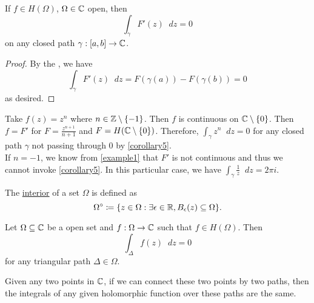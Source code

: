 \documentclass[11pt]{article}
\newcommand*\dif{\mathop{}\!d}
\begin{document}
\begin{corollary}
	If $f \in H(\Omega)$, $\Omega \in \mathbb{C}$ open, then
	\begin{equation*}
		\int_\gamma F'(z) \dif z = 0
	\end{equation*}
	on any closed path $\gamma: [a,b] \to \mathbb{C}$.
	\label{corollary5}
\end{corollary}
\begin{proof}
	By the , we have
	\begin{equation*}
		\int_\gamma F'(z) \dif z = F(\gamma(a))-F(\gamma(b)) = 0
	\end{equation*}
	as desired.
\end{proof}
\begin{example}
	Take $f(z) = z^n$ where $n \in \mathbb{Z} \setminus \{-1\}$. Then $f$ is continuous on
	$\mathbb{C} \setminus \{0\}$. Then $f=F'$ for $F = \frac{z^{n+1}}{n+1}$ and $F =
	H(\mathbb{C} \setminus \{0\})$. Therefore, $\int_\gamma z^n\dif z = 0$ for any closed
	path $\gamma$ not passing through 0 by \cref{corollary5}.\\
	\indent
	If $n = -1$, we know from \cref{example1} that $F'$ is not continuous and thus
	we cannot invoke \cref{corollary5}. In this particular case, we have
	$\int_\gamma \frac{1}{z} \dif z = 2\pi i$.
\end{example}
\begin{definition}
	The \underline{interior} of a set $\Omega$ is defined as
	\begin{equation*}
		\Omega^\circ \coloneqq \{ z \in \Omega : \exists \epsilon\in\mathbb{R}, B_\epsilon(z)
		\subseteq \Omega\}.
	\end{equation*}
\end{definition}
\begin{theorem}
	Let $\Omega\subseteq\mathbb{C}$ be a open set and $f:\Omega\to\mathbb{C}$ such that $f \in
	H(\Omega)$. Then
	\begin{equation*}
		\int_\Delta f(z) \dif z = 0
	\end{equation*}
	for any triangular path $\Delta\in\Omega$.
	\label{theorem6}
\end{theorem}
\begin{remark}
	Given any two points in $\mathbb{C}$, if we can connect these two points by two paths,
	then the integrals of any given holomorphic function over these paths are the
	same.
\end{remark}
\end{document}
